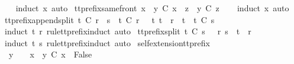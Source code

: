 %
\isadelimproof
\ \ %
\endisadelimproof
%
\isatagproof
{}\isamarkupfalse%
\ {\isacharparenleft}induct\ x{\isacharcomma}\ auto{\isacharparenright}%
\endisatagproof
{\isafoldproof}%
%
\isadelimproof
\isanewline
%
\endisadelimproof
\isanewline
{}\isamarkupfalse%
\ tt{\isacharunderscore}prefix{\isacharunderscore}same{\isacharunderscore}front{\isacharcolon}\ {\isachardoublequoteopen}{\isacharparenleft}x\ {\isacharat}\ y\ {\isasymle}\isactrlsub C\ x\ {\isacharat}\ z{\isacharparenright}\ {\isacharequal}\ {\isacharparenleft}y\ {\isasymle}\isactrlsub C\ z{\isacharparenright}{\isachardoublequoteclose}\isanewline
%
\isadelimproof
\ \ %
\endisadelimproof
%
\isatagproof
{}\isamarkupfalse%
\ {\isacharparenleft}induct\ x{\isacharcomma}\ auto{\isacharparenright}%
\endisatagproof
{\isafoldproof}%
%
\isadelimproof
\isanewline
%
\endisadelimproof
\isanewline
{}\isamarkupfalse%
\ tt{\isacharunderscore}prefix{\isacharunderscore}append{\isacharunderscore}split{\isacharcolon}\ {\isachardoublequoteopen}t\ {\isasymle}\isactrlsub C\ r\ {\isacharat}\ s\ {\isasymLongrightarrow}\ t\ {\isasymle}\isactrlsub C\ r\ {\isasymor}\ {\isacharparenleft}{\isasymexists}\ t{\isacharprime}{\isachardot}\ t\ {\isacharequal}\ r\ {\isacharat}\ t{\isacharprime}\ {\isasymand}\ t{\isacharprime}\ {\isasymle}\isactrlsub C\ s{\isacharparenright}{\isachardoublequoteclose}\isanewline
%
\isadelimproof
\ \ %
\endisadelimproof
%
\isatagproof
{}\isamarkupfalse%
\ {\isacharparenleft}induct\ t\ r\ rule{\isacharcolon}tt{\isacharunderscore}prefix{\isachardot}induct{\isacharcomma}\ auto{\isacharparenright}%
\endisatagproof
{\isafoldproof}%
%
\isadelimproof
\isanewline
%
\endisadelimproof
\isanewline
{}\isamarkupfalse%
\ tt{\isacharunderscore}prefix{\isacharunderscore}split{\isacharcolon}\ {\isachardoublequoteopen}t\ {\isasymle}\isactrlsub C\ s\ {\isasymLongrightarrow}\ {\isasymexists}\ r{\isachardot}\ s\ {\isacharequal}\ t\ {\isacharat}\ r{\isachardoublequoteclose}\isanewline
%
\isadelimproof
\ \ %
\endisadelimproof
%
\isatagproof
{}\isamarkupfalse%
\ {\isacharparenleft}induct\ t\ s\ rule{\isacharcolon}tt{\isacharunderscore}prefix{\isachardot}induct{\isacharcomma}\ auto{\isacharparenright}%
\endisatagproof
{\isafoldproof}%
%
\isadelimproof
\isanewline
%
\endisadelimproof
\isanewline
{}\isamarkupfalse%
\ self{\isacharunderscore}extension{\isacharunderscore}tt{\isacharunderscore}prefix{\isacharcolon}\ \isanewline
\ \ {\isachardoublequoteopen}y\ {\isasymnoteq}\ {\isacharbrackleft}{\isacharbrackright}\ {\isasymLongrightarrow}\ x\ {\isacharat}\ y\ {\isasymle}\isactrlsub C\ x\ {\isasymLongrightarrow}\ False{\isachardoublequoteclose}\isanewline
